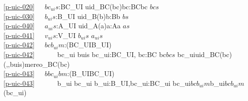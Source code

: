\ref{p-uic-020}\ \ \ $bc_{ui}s$:BC\_UI {\IS} {\LBRACE}uid\_BC(bc){\BAR}bc:BC{\RDOT}bc {\ISIN} $bcs${\RBRACE}\ \ \\
\ref{p-uic-030}\ \ \ $b_{ui}s$:B\_UI {\IS} {\UNION}{\LBRACE}uid\_B(b){\BAR}b:B{\RDOT}b {\ISIN} $bs${\RBRACE}\\
\ref{p-uic-040}\ \ \ $a_{ui}s$:A\_UI {\IS} {\LBRACE}uid\_A(a){\BAR}a:A{\RDOT}a {\ISIN} $as${\RBRACE}\\
\ref{p-uic-041}\ \ \ $v_{ui}s$:V\_UI {\IS} $b_{ui}s$ {\UNION} $a_{ui}s$\\
\ref{p-uic-042}\ \ \ $bcb_{ui}m$:(BC\_UI{\MARROW}B\_UI) {\IS} \\
\ref{p-uic-042}\ \ \ \ \ \ {\LBRACKET} bc\_ui {\MAPSTO} buis {\BAR} bc\_ui:BC\_UI, bc:BC {\RDOT} bc{\ISIN}$bcs$ {\WEDGE} bc\_ui{\EQ}uid\_BC(bc) {\WEDGE} ({\UNDERLINE},{\UNDERLINE},buis){\EQ}mereo\_BC(bc) {\RBRACKET}\ \ \\
\ref{p-uic-043}\ \ \ $bbc_{ui}bm$:(B\_UI{\MARROW}BC\_UI) {\IS} \\
\ref{p-uic-043}\ \ \ \ \ \ {\LBRACKET} b\_ui {\MAPSTO} bc\_ui {\BAR} b\_ui:B\_UI,bc\_ui:BC\_ui {\RDOT} bc\_ui{\EQ}$bcb_{ui}m${\WEDGE}b\_ui{\ISIN}$bcb_{ui}m$(bc\_ui) {\RBRACKET}
\ep

\pos{\normalsize}{\HHHH}

